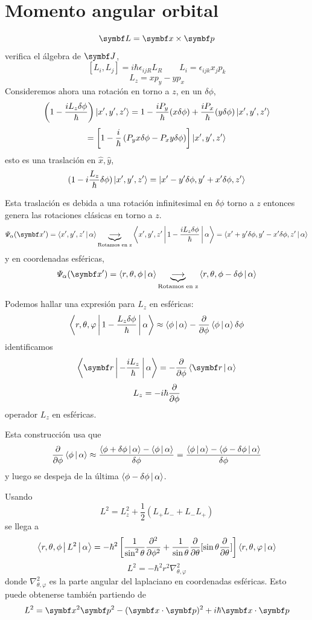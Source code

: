 \documentclass[10pt,oneside]{CBFT_book}
\begin{document}
\section{Momento angular orbital}

\[
	\vb{L} = \vb{x} \times \vb{p}
\]
verifica el álgebra de $\vb{J}$,
\[
	[ L_i, L_j ] = i\hbar \epsilon_{ijR} L_R \qquad L_i = \epsilon_{ijk}x_jp_k
\]
\[
	L_z = xp_y - yp_x
\]
Consideremos ahora una rotación en torno a $z$, en un $\delta\phi$,
\[
	\left( 1 - \frac{iL_z\delta\phi}{\hbar} \right) \Ket{x',y',z'} =
	1 - \frac{iP_y}{\hbar}(x\delta\phi) + \frac{iP_x}{\hbar}(y\delta\phi) \Ket{x',y',z'}
\]
\[
	= \left[ 1 - \frac{i}{\hbar}\left( P_y x\delta\phi - P_x y\delta\phi \right)\right] \Ket{x',y',z'}
\]
esto es una traslación en $\hat{x},\hat{y}$,
\[
	(1-i\frac{L_z}{\hbar}\delta\phi) \Ket{x',y',z'} = \Ket{x'-y'\delta\phi,y'+x'\delta\phi,z'}
\]

Esta traslación es debida a una rotación infinitesimal en $\delta\phi$ torno a $z$ entonces genera las 
rotaciones clásicas en torno a $z$.
\[
	\Psi_\alpha(\vb{x}') = \Braket{x',y',z'|\alpha} \underbrace{\longrightarrow}_{\text{Rotamos en z}}
	\Braket{x',y',z'|1-\frac{iL_z\delta\phi}{\hbar}|\alpha} = \Braket{x'+y'\delta\phi,y'-x'\delta\phi,z'|\alpha}
\]
y en coordenadas esféricas,
\[
	\Psi_\alpha(\vb{x}') = \Braket{r,\theta,\phi|\alpha} 
	\underbrace{\longrightarrow}_{\text{Rotamos en z}} \Braket{r,\theta,\phi-\delta\phi|\alpha}
\]

Podemos hallar una expresión para $L_z$ en esféricas:
\[
	\Braket{r,\theta,\varphi|1-\frac{L_z\delta\phi}{\hbar}|\alpha} \approx
	\Braket{\phi|\alpha} -\dpar{}{\phi}\Braket{\phi|\alpha}\delta\phi
\]
identificamos 
\[
	\Braket{\vb{r}|-\frac{iL_z}{\hbar}|\alpha} = -\dpar{}{\phi}\Braket{\vb{r}|\alpha}
\]
\[
	L_z =  -i\hbar\dpar{}{\phi}
\]
operador $L_z$ en esféricas.

Esta construcción usa que 
\[
	\dpar{}{\phi} \Braket{\phi|\alpha} \approx 
	\frac{\Braket{\phi+\delta\phi|\alpha}-\Braket{\phi|\alpha}}{\delta\phi} =
	\frac{\Braket{\phi|\alpha} -\Braket{\phi-\delta\phi|\alpha}}{\delta\phi}
\]
y luego se despeja de la última $\Braket{\phi-\delta\phi|\alpha}$.

Usando 
\[
	L^2 = L_z^2 + \frac{1}{2}\left( L_+L_- + L_-L_+ \right)
\]
se llega a 
\[
	\Braket{r,\theta,\phi|L^2|\alpha} = -\hbar^2\left[ \frac{1}{\sin^2 \theta}\dpar[2]{}{\phi} +
	\frac{1}{\sin \theta} \dpar{}{\theta}[\sin\theta\dpar{}{\theta} ]\right]
	\Braket{r,\theta,\varphi|\alpha}
\]
\[
	L^2 = -\hbar^2 r^2 \nabla^2_{\theta,\varphi}
\]
donde $\nabla^2_{\theta,\varphi}$ es la parte angular del laplaciano en coordenadas esféricas.
Esto puede obtenerse también partiendo de 
\[
	L^2 = \vb{x}^2\vb{p}^2 - (\vb{x}\cdot\vb{p})^2 + i\hbar \vb{x}\cdot\vb{p}
\]
\end{document}

